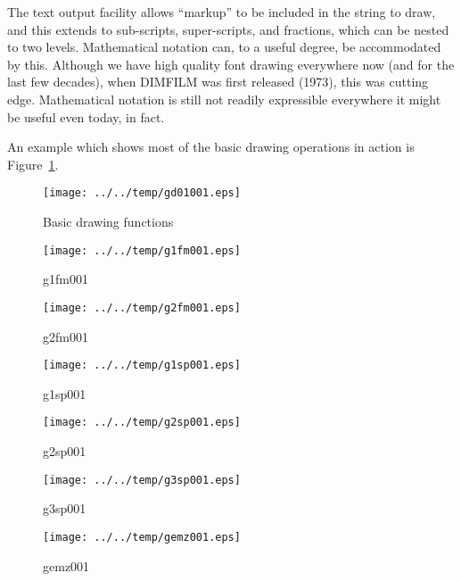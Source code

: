 \documentclass[a4paper,twoside,11pt]{article}
\makeatletter
\def\maxwidth{%
  \ifdim\Gin@nat@width>\linewidth
    \linewidth
  \else
    \Gin@nat@width
  \fi
}
\newcommand{\newpara}{\par\vspace{4mm}\noindent}
\makeatother
\begin{document}
\newpara
The text output facility allows ``markup'' to be included in the string
to draw, and this extends to sub-scripts, super-scripts, and fractions,
which can be nested to two levels. Mathematical notation can, to a
useful degree, be accommodated by this. Although we have high quality
font drawing everywhere now (and for the last few decades), when DIMFILM
was first released (1973), this was cutting edge. Mathematical notation
is still not readily expressible everywhere it might be useful even
today, in fact.

\newpara
An example which shows most of the basic drawing operations in action
is Figure~\ref{fig:gd01001}.

\begin{figure}
  \centering
  \texttt{[image: ../../temp/gd01001.eps]}
  \caption{Basic drawing functions}
  \label{fig:gd01001}
\end{figure}

\clearpage
\begin{figure}
  \centering
  \texttt{[image: ../../temp/g1fm001.eps]}
  \caption{g1fm001}
  \label{fig:g1fm001}
\end{figure}

\begin{figure}
  \centering
  \texttt{[image: ../../temp/g2fm001.eps]}
  \caption{g2fm001}
  \label{fig:g2fm001}
\end{figure}

\clearpage
\begin{figure}
  \centering
  \texttt{[image: ../../temp/g1sp001.eps]}
  \caption{g1sp001}
  \label{fig:g1sp001}
\end{figure}

\begin{figure}
  \centering
  \texttt{[image: ../../temp/g2sp001.eps]}
  \caption{g2sp001}
  \label{fig:g2sp001}
\end{figure}

\clearpage
\begin{figure}
  \centering
  \texttt{[image: ../../temp/g3sp001.eps]}
  \caption{g3sp001}
  \label{fig:g3sp001}
\end{figure}

\begin{figure}
  \centering
  \texttt{[image: ../../temp/gemz001.eps]}
  \caption{gemz001}
  \label{fig:gemz001}
\end{figure}
\end{document}
